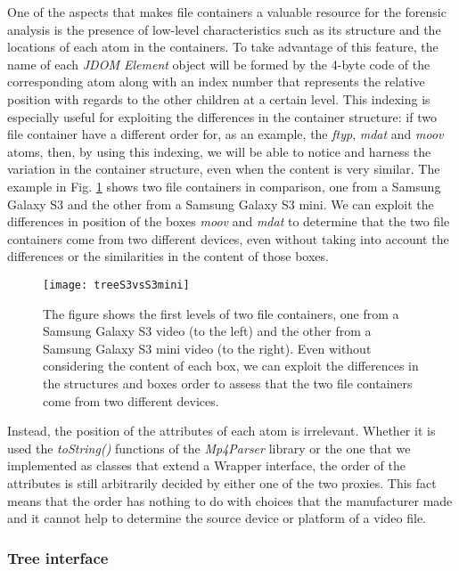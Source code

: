 One of the aspects that makes file containers a valuable resource for the forensic analysis is the presence of low-level characteristics such as its structure and the locations of each atom in the containers. To take advantage of this feature, the name of each \emph{JDOM Element} object will be formed by the 4-byte code of the corresponding atom along with an index number that represents the relative position with regards to the other children at a certain level. This indexing is especially useful for exploiting the differences in the container structure: if two file container have a different order for, as an example, the \emph{ftyp}, \emph{mdat} and \emph{moov} atoms, then, by using this indexing, we will be able to notice and harness the variation in the container structure, even when the content is very similar. The example in Fig. \ref{fig:treeS3vsS3mini} shows two file containers in comparison, one from a Samsung Galaxy S3 and the other from a Samsung Galaxy S3 mini. We can exploit the differences in position of the boxes \emph{moov} and \emph{mdat} to determine that the two file containers come from two different devices, even without taking into account the differences or the similarities in the content of those boxes. 

\begin{figure}
  \centering
  \texttt{[image: treeS3vsS3mini]}
  \caption{The figure shows the first levels of two file containers, one from a Samsung Galaxy S3 video (to the left) and the other from a Samsung Galaxy S3 mini video (to the right). Even without considering the content of each box, we can exploit the differences in the structures and boxes order to assess that the two file containers come from two different devices.}\label{fig:treeS3vsS3mini}
\end{figure}

Instead, the position of the attributes of each atom is irrelevant. Whether it is used the \emph{toString()} functions of the \emph{Mp4Parser} library or the one that we implemented as classes that extend a Wrapper interface, the order of the attributes is still arbitrarily decided by either one of the two proxies. This fact means that the order has nothing to do with choices that the manufacturer made and it cannot help to determine the source device or platform of a video file.

\subsubsection*{Tree interface}


